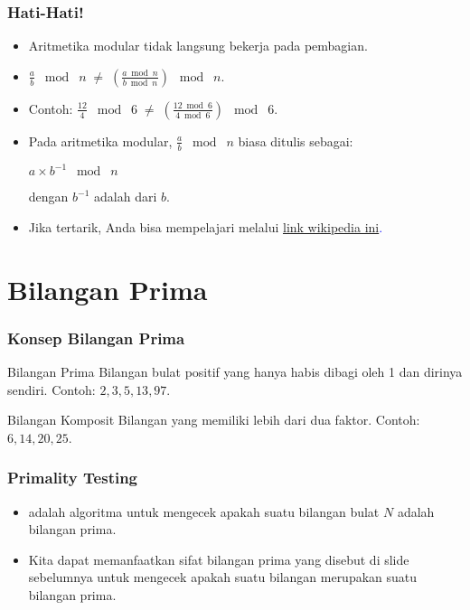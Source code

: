 \begin{frame}
\frametitle{Hati-Hati!}
\begin{itemize}
  \item Aritmetika modular tidak langsung bekerja pada pembagian.
  \item $\frac{a}{b} \; \bmod\; n \; \neq \; \left( \frac{a \bmod n}{b \bmod n} \right) \; \bmod\; n$.
  \item Contoh: $\frac{12}{4} \; \bmod\; 6 \; \neq \; \left( \frac{12 \bmod 6}{4 \bmod 6} \right) \; \bmod\; 6$.
  \newline
  \item Pada aritmetika modular, $\frac{a}{b} \; \bmod\; n$ biasa ditulis sebagai:
  \newline
  \begin{center}
    $a \times b^{-1}\; \bmod\; n$
    \newline
  \end{center}
  dengan $b^{-1}$ adalah  dari $b$.
  \item Jika tertarik, Anda bisa mempelajari  melalui \textcolor{blue}{\href{https://en.wikipedia.org/wiki/  Modular_multiplicative_inverse}{link wikipedia ini}.} 
\end{itemize}
\end{frame}

\section{Bilangan Prima}
\frame{\sectionpage}

\begin{frame}
\frametitle{Konsep Bilangan Prima}
\begin{block}{Bilangan Prima}
Bilangan bulat positif yang hanya habis dibagi oleh 1 dan dirinya sendiri.
\newline
Contoh: $2, 3, 5, 13, 97$.
\end{block}

\begin{block}{Bilangan Komposit}
Bilangan yang memiliki lebih dari dua faktor.
\newline
Contoh: $6, 14, 20, 25$.
\end{block}
\end{frame}

\begin{frame}
\frametitle{Primality Testing}
\begin{itemize}
  \item {} adalah algoritma untuk mengecek apakah suatu bilangan bulat $N$ adalah bilangan prima.
  \item Kita dapat memanfaatkan sifat bilangan prima yang disebut di slide sebelumnya untuk mengecek apakah suatu bilangan merupakan suatu bilangan prima. 
\end{itemize}
\end{frame}

